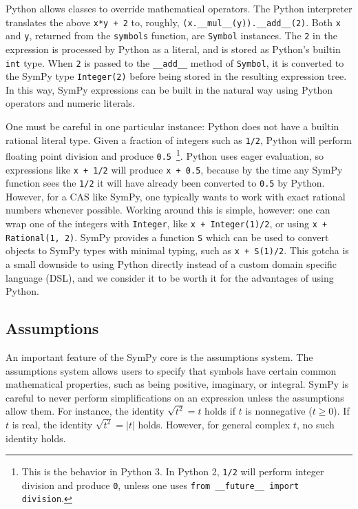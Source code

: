 Python allows classes to override mathematical operators. The Python
interpreter translates the above \texttt{x*y + 2} to, roughly,
\verb|(x.__mul__(y)).__add__(2)|. Both \texttt{x} and \texttt{y}, returned
from the \texttt{symbols} function, are \texttt{Symbol} instances. The
\texttt{2} in the expression is processed by Python as a literal, and is
stored as Python's builtin \texttt{int} type. When \texttt{2} is passed to the
\verb|__add__| method of \texttt{Symbol}, it is converted to the SymPy type
\verb|Integer(2)| before being stored in the resulting expression tree. In
this way, SymPy expressions can be built in the natural way using Python
operators and numeric literals.

One must be careful in one particular instance: Python does not have a builtin
rational literal type. Given a fraction of integers such as \texttt{1/2},
Python will perform floating point division and produce
\texttt{0.5}~\footnote{This is the behavior in Python 3. In Python 2,
  \texttt{1/2} will perform integer division and produce \texttt{0}, unless
  one uses \texttt{from \_\_future\_\_ import division}.}. Python uses eager
evaluation, so expressions like \texttt{x + 1/2} will produce \texttt{x +
  0.5}, because by the time any SymPy function sees the \texttt{1/2} it will
have already been converted to \texttt{0.5} by Python. However, for a CAS like
SymPy, one typically wants to work with exact rational numbers whenever
possible. Working around this is simple, however: one can wrap one of the
integers with \texttt{Integer}, like \verb|x + Integer(1)/2|, or using
\verb|x + Rational(1, 2)|. SymPy provides a function \texttt{S} which can be
used to convert objects to SymPy types with minimal typing, such as
\verb|x + S(1)/2|. This gotcha is a small downside to using Python directly
instead of a custom domain specific language (DSL), and we consider it to be
worth it for the advantages of using Python.

\subsection{Assumptions}

An important feature of the SymPy core is the assumptions system. The
assumptions system allows users to specify that symbols have certain common
mathematical properties, such as being positive, imaginary, or integral. SymPy
is careful to never perform simplifications on an expression unless the
assumptions allow them. For instance, the identity $\sqrt{t^2} = t$ holds if
$t$ is nonnegative ($t\ge 0$). If $t$ is real, the identity $\sqrt{t^2}=|t|$
holds. However, for general complex $t$, no such identity holds.

